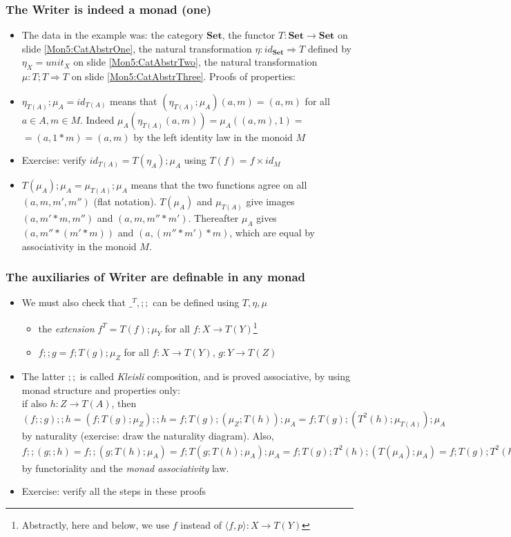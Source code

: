 \documentclass[handout]{beamer}
\newcommand{\To}{\Rightarrow}
\newcommand{\bfsf}[1]{{\boldsymbol{#1}}}
\newcommand{\Set}{\bfsf{Set}}
\newcommand{\Kp}[1]{{\langle #1 \rangle}}
\newcommand{\Kc}{;\!;}
\begin{document}
\frame
  {   
    \frametitle{The Writer is indeed a monad (one)}\label{Mon5:ExaMonad}

 \begin{itemize}[<+->]
\item The data in the example was: the category $\Set$, 
the functor $T:\Set\to\Set$ on slide \ref{Mon5:CatAbstrOne}, 
the natural transformation $\eta: id_\Set\To T$
defined by $\eta_X = unit_X$ on slide \ref{Mon5:CatAbstrTwo}, 
the natural transformation $\mu: T;T \To T$
on slide \ref{Mon5:CatAbstrThree}. Proofs of properties:
\item $\eta_{T(A)};\mu_A = id_{T(A)}$ means that  $(\eta_{T(A)};\mu_A)(a,m) = (a,m)$
for all $a\in A, m\in M$. Indeed $\mu_A(\eta_{T(A)}(a,m)) = \mu_A((a,m),1) =$ $= (a,1*m) = (a,m)$
by the left identity law in the monoid $M$
\item Exercise: verify  $id_{T(A)} = T(\eta_A);\mu_A$ using $T(f) = f\times id_M$
\item $T(\mu_A);\mu_A = \mu_{T(A)};\mu_A$ means that the two functions agree
on all $(a,m,m',m'')$ (flat notation). $T(\mu_A)$ and $\mu_{T(A)}$ give images $(a,m'*m,m'')$ and $(a,m,m''*m')$. Thereafter $\mu_A$ gives $(a,m''*(m'*m))$ and $(a,(m''*m')*m)$, which are equal by associativity in the monoid $M$.
 \end{itemize}

 }

\frame
  {   
    \frametitle{The auxiliaries of Writer are definable in any monad}\label{Mon5:ExaMonadAux}

 \begin{itemize}[<+->]
\item We must also check that $\_^T, \Kc$ can be defined using $T,\eta,\mu$
 \begin{itemize}
\item the \emph{extension} $f^T = T(f);\mu_Y$ for all $f: X\to T(Y)$\footnote{Abstractly, here and below,
we use $f$ instead of $\Kp{f,p}:X\to T(Y)$}
\item $f \Kc  g = f ;T(g);\mu_Z$ for all $f: X\to T(Y)$, $g: Y\to T(Z)$
 \end{itemize}
\item The latter $\Kc$ is called \emph{Kleisli} composition, and is proved
associative, by using monad structure and properties only:\\
if also $h: Z\to T(A)$, then
$(f \Kc g) \Kc h = (f ;T(g);\mu_Z) \Kc h = f ;T(g);(\mu_Z; T(h)) ; \mu_A =
f ;T(g);(T^2(h);\mu_{T(A)}) ; \mu_A$ by naturality (exercise: draw the naturality diagram). 
Also, $f \Kc (g \Kc h) = f \Kc (g;T(h);\mu_A) = f; T(g;T(h);\mu_A);\mu_A =
f; T(g);T^2(h);(T(\mu_A);\mu_A) = f; T(g);T^2(h);(\mu_{T(A)};\mu_A)$
by functoriality and the \emph{monad associativity} law.

\item Exercise: verify all the steps in these proofs
 \end{itemize}

 }
\end{document}
